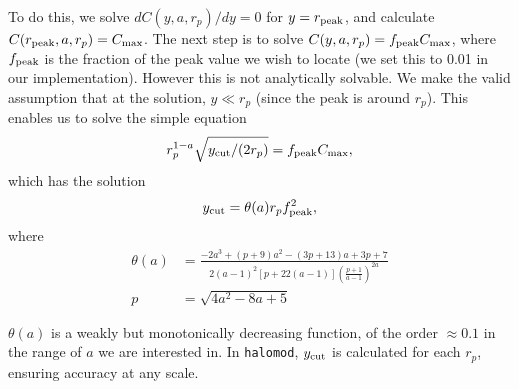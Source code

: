 \documentclass[5p,aas_macros]{elsarticle}
\begin{document}
To do this, we solve $d C(y,a,r_p)/dy = 0$ for $y=r_{\rm peak}$, and calculate $C(r_{\rm peak},a,r_p) = C_{\rm max}$. The next step is to solve $C(y,a,r_p) = f_{\rm peak}C_{\rm max}$, where $f_{\rm peak}$ is the fraction of the peak value we wish to locate (we set this to 0.01 in our implementation). However this is not analytically solvable. We make the valid assumption that at the solution, $y \ll r_p$ (since the peak is around $r_p$). 
This enables us to solve the simple equation 
\begin{equation}
	\label{eq:projcorrsolve}
	r_p^{1-a}\sqrt{y_{\rm cut}/(2r_p)} = f_{\rm peak}C_{\rm max},
\end{equation}
which has the solution
\begin{equation}
	\label{eq:projcorrsolution}
	y_{\rm cut} = \theta(a)r_pf_{\rm peak}^2,
\end{equation}
where
\begin{align}
	\label{eq:theta}
	\theta(a) &= \frac{-2 a^3+\left(p+9\right) a^2-\left(3p+13\right) a+3p+7}{2(a-1)^2 \left[p+22(a-1)\right]\left(\frac{p+1}{a-1}\right)^{2 a}} \\
	p &= \sqrt{4 a^2-8 a+5}
\end{align}

$\theta(a)$ is a weakly but monotonically decreasing function, of the order $\approx 0.1$ in the range of $a$ we are interested in. In \verb|halomod|, $y_{\rm cut}$ is calculated for each $r_p$, ensuring accuracy at any scale.
\end{document}
